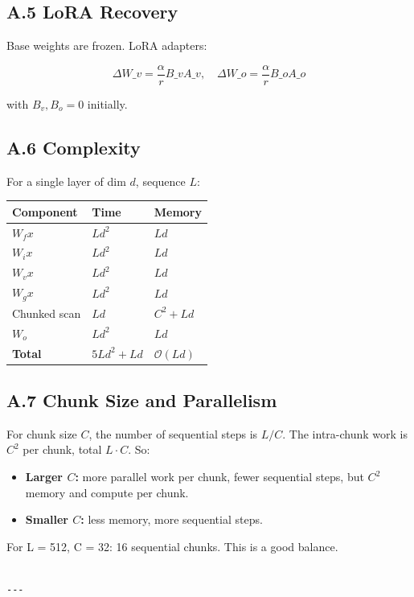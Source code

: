 \subsection{A.5 LoRA Recovery}

Base weights are frozen. LoRA adapters:

\[
\Delta W\_v = \frac{\alpha}{r} B\_v A\_v, \quad
\Delta W\_o = \frac{\alpha}{r} B\_o A\_o
\tag{A.10}
\]

with $B_v, B_o = 0$ initially.

\subsection{A.6 Complexity}

For a single layer of dim $d$, sequence $L$:

\begin{table}[H]
\centering
\small
\begin{tabular}{lll}
\toprule
\textbf{Component} & \textbf{Time} & \textbf{Memory} \\
\midrule
$W_f x$ & $L d^2$ & $L d$ \\
$W_i x$ & $L d^2$ & $L d$ \\
$W_v x$ & $L d^2$ & $L d$ \\
$W_g x$ & $L d^2$ & $L d$ \\
Chunked scan & $L d$ & $C^2 + L d$ \\
$W_o$ & $L d^2$ & $L d$ \\
\textbf{Total} & $5 L d^2 + L d$ & $\mathcal{O}(L d)$ \\
\bottomrule
\end{tabular}
\end{table}

\subsection{A.7 Chunk Size and Parallelism}

For chunk size $C$, the number of sequential steps is $L / C$. The 
intra-chunk work is $C^2$ per chunk, total $L \cdot C$. So:

\begin{itemize}
\item \textbf{Larger $C$:} more parallel work per chunk, fewer sequential steps, but
  $C^2$ memory and compute per chunk.
\item \textbf{Smaller $C$:} less memory, more sequential steps.

\end{itemize}
For L = 512, C = 32: 16 sequential chunks. This is a good balance.
\begin{lstlisting}

---
\end{lstlisting}

